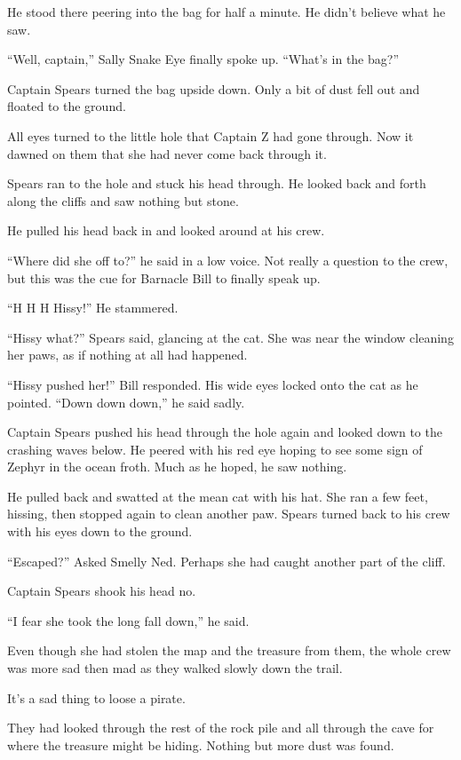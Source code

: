 \documentclass[12pt]{extbook}
\begin{document}
  He stood there peering into the bag for half a minute. He didn't believe
  what he saw.
  
  \enquote{Well, captain,} Sally Snake Eye finally spoke up.
  \enquote{What's in the bag?}
  
  Captain Spears turned the bag upside down. Only a bit of dust fell out
  and floated to the ground.
  
  All eyes turned to the little hole that Captain Z had gone through. Now
  it dawned on them that she had never come back through it.
  
  Spears ran to the hole and stuck his head through. He looked back and
  forth along the cliffs and saw nothing but stone.
  
  He pulled his head back in and looked around at his crew.
  
  \enquote{Where did she off to?} he said in a low voice. Not really a
  question to the crew, but this was the cue for Barnacle Bill to finally
  speak up.
  
  \enquote{H H H Hissy!} He stammered.
  
  \enquote{Hissy what?} Spears said, glancing at the cat. She was near the
  window cleaning her paws, as if nothing at all had happened.
  
  \enquote{Hissy pushed her!} Bill responded. His wide eyes locked onto
  the cat as he pointed. \enquote{Down down down,} he said sadly.
  
  Captain Spears pushed his head through the hole again and looked down to
  the crashing waves below. He peered with his red eye hoping to see some
  sign of Zephyr in the ocean froth. Much as he hoped, he saw nothing.
  
  He pulled back and swatted at the mean cat with his hat. She ran a few
  feet, hissing, then stopped again to clean another paw. Spears turned
  back to his crew with his eyes down to the ground.
  
  \enquote{Escaped?} Asked Smelly Ned. Perhaps she had caught another part
  of the cliff.
  
  Captain Spears shook his head no.
  
  \enquote{I fear she took the long fall down,} he said.
  
  Even though she had stolen the map and the treasure from them, the whole
  crew was more sad then mad as they walked slowly down the trail.
  
  It's a sad thing to loose a pirate.
  
  They had looked through the rest of the rock pile and all through the
  cave for where the treasure might be hiding. Nothing but more dust was
  found.
  
\end{document}
